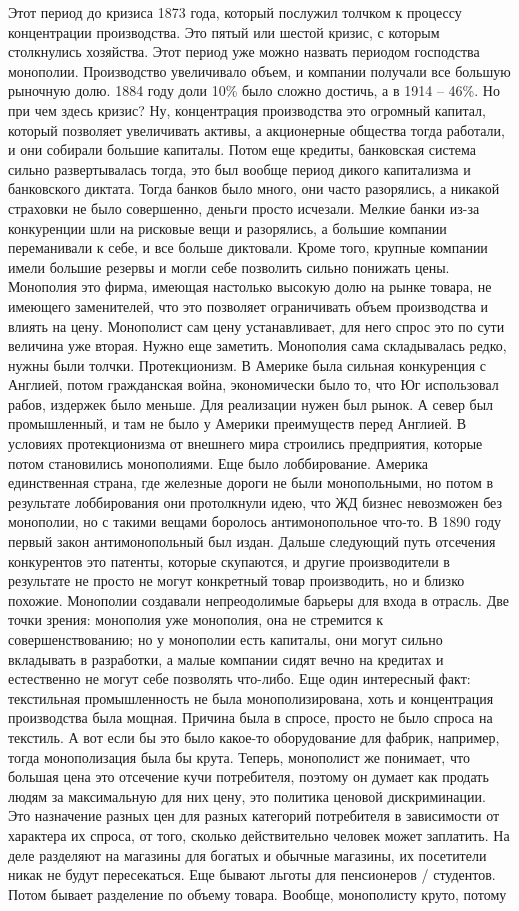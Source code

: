 \documentclass[a4paper, 12pt]{article}
\begin{document}
Этот период до кризиса 1873 года, который послужил толчком к процессу концентрации производства. Это пятый или шестой кризис, с которым столкнулись хозяйства. Этот период уже можно назвать периодом господства монополии. Производство увеличивало объем, и компании получали все большую рыночную долю. 1884 году доли 10\% было сложно достичь, а в 1914 -- 46\%. Но при чем здесь кризис? Ну, концентрация производства это огромный капитал, который позволяет увеличивать активы, а акционерные общества тогда работали, и они собирали большие капиталы. Потом еще кредиты, банковская система сильно развертывалась тогда, это был вообще период дикого капитализма и банковского диктата. Тогда банков было много, они часто разорялись, а никакой страховки не было совершенно, деньги просто исчезали. Мелкие банки из-за конкуренции шли на рисковые вещи и разорялись, а большие компании переманивали к себе, и все больше диктовали. Кроме того, крупные компании имели большие резервы и могли себе позволить сильно понижать цены. Монополия это фирма, имеющая настолько высокую долю на рынке товара, не имеющего заменителей, что это позволяет ограничивать объем производства и влиять на цену. Монополист сам цену устанавливает, для него спрос это по сути величина уже вторая. Нужно еще заметить. Монополия сама складывалась редко, нужны были толчки. Протекционизм. В Америке была сильная конкуренция с Англией, потом гражданская война, экономически было то, что Юг использовал рабов, издержек было меньше. Для реализации нужен был рынок. А север был промышленный, и там не было у Америки преимуществ перед Англией. В условиях протекционизма от внешнего мира строились предприятия, которые потом становились монополиями. Еще было лоббирование. Америка единственная страна, где железные дороги не были монопольными, но потом в результате лоббирования они протолкнули идею, что ЖД бизнес невозможен без монополии, но с такими вещами боролось антимонопольное что-то. В 1890 году первый закон антимонопольный был издан. Дальше следующий путь отсечения конкурентов это патенты, которые скупаются, и другие производители в результате не просто не могут конкретный товар производить, но и близко похожие. Монополии создавали непреодолимые барьеры для входа в отрасль. Две точки зрения: монополия уже монополия, она не стремится к совершенствованию; но у монополии есть капиталы, они могут сильно вкладывать в разработки, а малые компании сидят вечно на кредитах и естественно не могут себе позволять что-либо. Еще один интересный факт: текстильная промышленность не была монополизирована, хоть и концентрация производства была мощная. Причина была в спросе, просто не было спроса на текстиль. А вот если бы это было какое-то оборудование для фабрик, например, тогда монополизация была бы крута. Теперь, монополист же понимает, что большая цена это отсечение кучи потребителя, поэтому он думает как продать людям за максимальную для них цену, это политика ценовой дискриминации. Это назначение разных цен для разных категорий потребителя в зависимости от характера их спроса, от того, сколько действительно человек может заплатить. На деле разделяют на магазины для богатых и обычные магазины, их посетители никак не будут пересекаться. Еще бывают льготы для пенсионеров / студентов. Потом бывает разделение по объему товара. Вообще, монополисту круто, потому 
\end{document}
